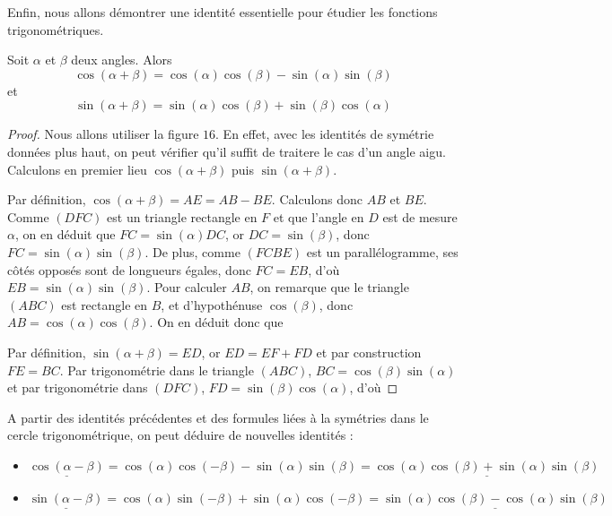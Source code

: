 Enfin, nous allons démontrer une identité essentielle pour étudier les fonctions trigonométriques.


\begin{prop}
    Soit $\alpha$ et $\beta$ deux angles. Alors $$\cos(\alpha+\beta)=\cos(\alpha)\cos(\beta)-\sin(\alpha)\sin(\beta)$$ et $$\sin(\alpha+\beta)=\sin(\alpha)\cos(\beta)+\sin(\beta)\cos(\alpha)$$
\end{prop}
\begin{proof}
    Nous allons utiliser la figure $16$. En effet, avec les identités de symétrie données plus haut, on peut vérifier qu'il suffit de traitere le cas d'un angle aigu. Calculons en premier lieu $\cos(\alpha+\beta)$ puis $\sin(\alpha+\beta)$.
    
    Par définition, $\cos(\alpha+\beta)=AE=AB-BE$. Calculons donc $AB$ et $BE$. Comme $(DFC)$ est un triangle rectangle en $F$ et que l'angle en $D$ est de mesure $\alpha$, on en déduit que $FC=\sin(\alpha)DC$, or $DC=\sin(\beta)$, donc $FC=\sin(\alpha)\sin(\beta)$. De plus, comme $(FCBE)$ est un parallélogramme, ses côtés opposés sont de longueurs égales, donc $FC=EB$, d'où $EB=\sin(\alpha)\sin(\beta)$. Pour calculer $AB$, on remarque que le triangle $(ABC)$ est rectangle en $B$, et d'hypothénuse $\cos(\beta)$, donc $AB=\cos(\alpha)\cos(\beta)$. On en déduit donc que 
    
    Par définition, $\sin(\alpha+\beta)=ED$, or $ED=EF+FD$ et par construction $FE=BC$. Par trigonométrie dans le triangle $(ABC)$, $BC=\cos(\beta)\sin(\alpha)$ et par trigonométrie dans $(DFC)$, $FD=\sin(\beta)\cos(\alpha)$, d'où 
\end{proof}

A partir des identités précédentes et des formules liées à la symétries dans le cercle trigonométrique, on peut déduire de nouvelles identités :
\begin{itemize}[label=$\bullet$]
    \item $\underline{\cos(\alpha-\beta)}=\cos(\alpha)\cos(-\beta)-\sin(\alpha)\sin(\beta)=\underline{\cos(\alpha)\cos(\beta)+\sin(\alpha)\sin(\beta)}$
    \item $\underline{\sin(\alpha-\beta)}=\cos(\alpha)\sin(-\beta)+\sin(\alpha)\cos(-\beta)=\underline{\sin(\alpha)\cos(\beta)-\cos(\alpha)\sin(\beta)}$
\end{itemize}

